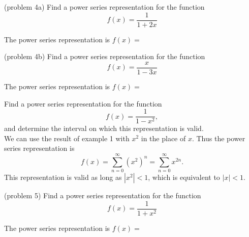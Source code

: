 \documentclass{ximera}
\begin{document}
\begin{problem}(problem 4a)
Find a power series representation for the function
\[
f(x) = \frac{1}{1+ 2x}
\]

The power series representation is $f(x) = $
\begin{multipleChoice}
\end{multipleChoice}
\end{problem}




\begin{problem}(problem 4b)
Find a power series representation for the function
\[
f(x) = \frac{x}{1-3x}
\]

The power series representation is $f(x) = $
\begin{multipleChoice}
\end{multipleChoice}
\end{problem}



\begin{example}[example 5]
Find a power series representation for the function
\[
f(x) = \frac{1}{1-x^2},
\]
and determine the interval on which this representation is valid.\\
We can use the result of example 1 with $x^2$ in the place of $x$.
Thus the power series representation is
\[
f(x) = \sum_{n=0}^\infty (x^2)^n  = \sum_{n=0}^\infty x^{2n}. 
\]
This representation is valid as long as $|x^2| < 1$, which is equivalent to $|x| < 1$.

\end{example}


\begin{problem}(problem 5)
Find a power series representation for the function
\[
f(x) = \frac{1}{1+x^2}
\]

The power series representation is $f(x) = $
\begin{multipleChoice}
\end{multipleChoice}
\end{problem}
\end{document}
